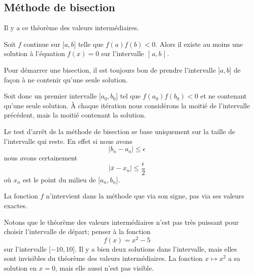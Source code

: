 \subsection{Méthode de bisection}

Il y a ce théorème des valeurs intermédiaires.
\begin{theorem}
	Soit \( f\) continue sur \( \mathopen[ a , b \mathclose]\) telle que \( f(a)f(b)<0\). Alors il existe au moins une solution à l'équation \( f(x)=0\) sur l'intervalle \( \mathopen] a , b \mathclose[\).
\end{theorem}

Pour démarrer une bisection, il est toujours bon de prendre l'intervalle \( \mathopen[ a , b \mathclose]\) de façon à ne contenir qu'une seule solution.

Soit donc un premier intervalle \( \mathopen[ a_0 , b_0 \mathclose]\) tel que \( f(a_0)f(b_0)<0\) et ne contenant qu'une seule solution. À chaque itération nous considérons la moitié de l'intervalle précédent, mais la moitié contenant la solution.

Le test d'arrêt de la méthode de bisection se base uniquement sur la taille de l'intervalle qui reste. En effet si nous avons
\begin{equation}
	| b_n-a_n |\leq \epsilon
\end{equation}
nous avons certainement
\begin{equation}
	| \bar x-x_n |\leq \frac{ \epsilon }{2}
\end{equation}
où \( x_n\) est le point du milieu de \( \mathopen[ a_n , b_n \mathclose]\).

\begin{normaltext}
	La fonction \( f\) n'intervient dans la méthode que via son signe, pas via ses valeurs exactes.
\end{normaltext}

\begin{normaltext}
	Notons que le théorème des valeurs intermédiaires n'est pas très puissant pour choisir l'intervalle de départ; penser à la fonction
	\begin{equation}
		f(x)=x^2-5
	\end{equation}
	sur l'intervalle \( \mathopen[ -10 , 10 \mathclose]\). Il y a bien deux solutions dans l'intervalle, mais elles sont invisibles du théorème des valeurs intermédiaires. La fonction \( x\mapsto x^2\) a sa solution en \( x=0\), mais elle aussi n'est pas visible.
\end{normaltext}

